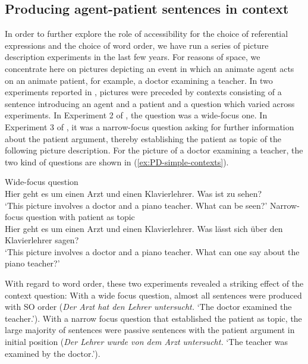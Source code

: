 \documentclass[output=paper,colorlinks,citecolor=brown]{langscibook}
\begin{document}
\subsection{Producing agent-patient sentences in context}

In order to further explore the role of accessibility for the choice of referential expressions and the choice of word order, we have run a series of picture description experiments in the last few years. For reasons of space, we concentrate here on pictures depicting an event in which an animate agent acts on an animate patient, for example, a doctor examining a teacher. In two experiments reported in \citet{Bader::al-17}, pictures were preceded by contexts consisting of a sentence introducing an agent and a patient and a question which varied across experiments. In Experiment 2 of \citet{Bader::al-17}, the question was a wide-focus one. In Experiment 3 of \citet{Bader::al-17}, it was a narrow-focus question asking for further information about the patient argument, thereby establishing the patient as topic of the following picture description. For the picture of a doctor examining a teacher, the two kind of questions are shown in (\ref{ex:PD-simple-contexts}).

\ea \label{ex:PD-simple-contexts}
  \ea  Wide-focus question\\
     Hier geht es um einen Arzt und einen Klavierlehrer. Was ist zu sehen?\label{ex:PD-simple-contexts-wide}\\
     \enquote*{This picture involves a doctor and a piano teacher. What can be seen?}
  \ex Narrow-focus question with patient as topic\label{ex:PD-simple-contexts-narrow}\\
      Hier geht es um einen Arzt und einen Klavierlehrer. 
      Was lässt sich über den Klavierlehrer sagen?\\
     \enquote*{This picture involves a doctor and a piano teacher. What can one say about the piano teacher?}
\z\z

With regard to word order, these two experiments revealed a striking effect of the context question: With a wide focus question, almost all sentences were produced with SO order (\textit{Der Arzt hat den Lehrer untersucht.} `The doctor examined the teacher.'). With a narrow focus question that established the patient as topic, the large majority of sentences were passive sentences with the patient argument in initial position (\textit{Der Lehrer wurde von dem Arzt untersucht.} `The teacher was examined by the doctor.'). 
\end{document}

